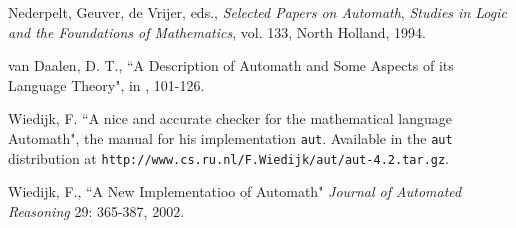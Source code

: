 \documentclass{article}
\begin{document}
\begin{thebibliography}{99}
  Nederpelt, Geuver, de Vrijer, eds., {\em Selected Papers on Automath\/}, {\em Studies in Logic and the Foundations of Mathematics\/}, vol. 133, North Holland, 1994.

  van Daalen, D. T., ``A Description of Automath and Some Aspects of its Language Theory", in \cite{yellowbook}, 101-126.

 Wiedijk, F.  ``A nice and accurate checker for the mathematical language Automath", the manual for his implementation {\tt aut}.  Available in the {\tt aut} distribution at {\tt http://www.cs.ru.nl/F.Wiedijk/aut/aut-4.2.tar.gz}.

  Wiedijk, F., ``A New Implementatioo of Automath" {\em Journal of Automated Reasoning\/}
29: 365-387, 2002.

\end{thebibliography}
\end{document}
